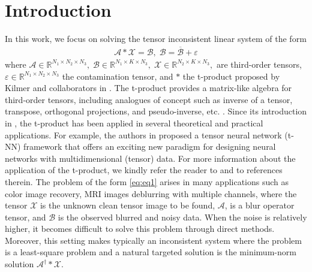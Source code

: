 \documentclass[11pt]{article}
\def\fm#1{\mathcal{#1}}
\def\r{\mathbb{R}}
\newcommand{\comment}[1]{}
\begin{document}
\section{Introduction}
In this work, we focus on solving the tensor inconsistent  linear system  of the form 
\begin{align}
\label{eq:eq1}
\mathcal{A} * \mathcal{X} =  \mathcal{B},\;  \fm B = \overline{\fm B} + \varepsilon
\end{align}
where $\mathcal{A}\in\mathbb{R}^{N_1\times N_2\times N_3},\;
\mathcal{B}\in\mathbb{R}^{N_1\times K\times N_3},\;
\mathcal{X}\in\mathbb{R}^{N_2\times K\times N_3},$  are third-order tensors, $\varepsilon \in \r^{N_1\times N_2\times N_3}$ the contamination tensor,  and $*$ the t-product proposed by Kilmer and collaborators in  \cite{kilmer2011facto, kilmer2013thirdOrder}. The t-product \comment{for tensors} provides a matrix-like algebra for third-order tensors, including analogues of  concept such as inverse of a tensor, transpose, orthogonal projections, and  pseudo-inverse, etc. \cite{kilmer2011facto, kilmer2013thirdOrder}. Since its introduction in \cite{kilmer2011facto}, the t-product has been applied in several theoretical and practical applications. For example, the authors in \cite{newman2018} proposed a tensor neural network (t-NN) framework that offers an exciting new paradigm for designing neural networks with multidimensional (tensor) data. For more information about the application of the t-product, we  kindly refer the reader to  \cite{zhang2018, qi2021, wang2020, newman2018, miao2020gener} and to  references therein. \comment{for further detailed applications of the t-product }\comment{in various topics like Singular Value Decomposition, Image recognition, neural network.  The authors in \cite{newman2018} proposed a new paradigm for training neural network faster} The problem of the form \eqref{eq:eq1} arises in many applications such as color image recovery,  MRI images deblurring with multiple channels, where the tensor  $\fm X$ is the unknown clean tensor image to be found, $\fm A$, is a blur operator tensor, and $\fm B$ is the observed blurred and noisy data. When the noise is relatively higher, it becomes difficult to solve this problem  through direct methods. Moreover, this setting makes typically an inconsistent system  where the problem is a least-square problem and a natural targeted solution is the minimum-norm  solution $\fm A^\dagger * \fm X$. \comment{ in the t-product sense. }
\end{document}
